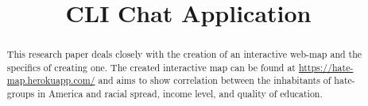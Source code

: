 \documentclass[twoside]{article}
\title{\vspace{-15mm}\fontsize{24pt}{10pt}\selectfont\textbf{CLI Chat Application}} %
\author{
\large
\textsc{Nir Boneh}\\[2mm] %
\normalsize University of Colorado Boulder \\ %
\normalsize \href{mailto:nir.boneh@colorado.edu}{nir.boneh@colorado.edu} %
\normalsize \href Source Code: {https://github.com/nboneh/CLIChatApp}{https://github.com/nboneh/CLIChatApp}                    %
\vspace{-5mm}
}
\date{}
\begin{document}
\maketitle %

\thispagestyle{fancy} %


\begin{abstract}

\noindent
This research paper deals closely with the creation of an interactive web-map and the specifics of creating one.
The created interactive map can be found at \url{https://hate-map.herokuapp.com/} and aims to show correlation
between the inhabitants of hate-groups in America and racial spread, income level, and quality of education.

\end{abstract}

\end{document}
